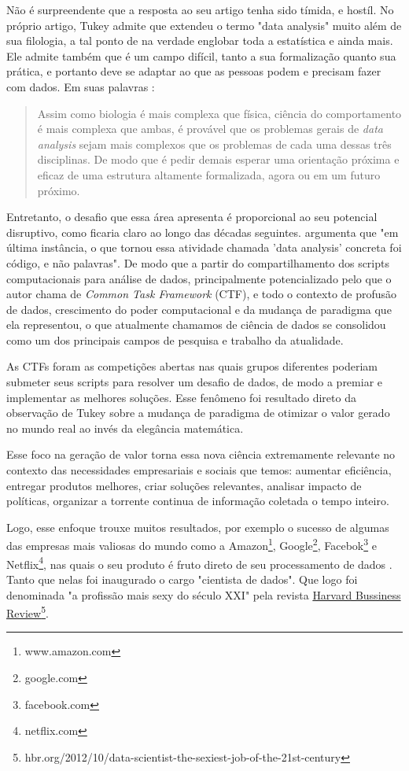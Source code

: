 \documentclass{article}
\begin{document}
Não é surpreendente que a resposta ao seu artigo tenha sido tímida, e hostíl.\cite{DONOHO} No próprio artigo, Tukey admite que extendeu o termo "data analysis" muito além de sua filologia, a tal ponto de na verdade englobar toda a estatística e ainda mais. Ele admite também que é um campo difícil, tanto a sua formalização quanto sua prática, e portanto deve se adaptar ao que as pessoas podem e precisam fazer com dados. Em suas palavras \cite{FoDA}:
\begin{quote}
Assim como biologia é mais complexa que física, ciência do comportamento é mais complexa que ambas, é provável que os problemas gerais de \textit{data analysis} sejam mais complexos que os problemas de cada uma dessas três disciplinas. 
De modo que é pedir demais esperar uma orientação próxima e eficaz de uma estrutura altamente formalizada, agora ou em um futuro próximo. 
\end{quote}

Entretanto, o desafio que essa área apresenta é proporcional ao seu potencial disruptivo, como ficaria claro ao longo das décadas seguintes. \cite{DONOHO} argumenta que "em última instância, o que tornou essa atividade chamada 'data analysis' concreta foi código, e não palavras". De modo que a partir do compartilhamento dos scripts computacionais para análise de dados, principalmente potencializado pelo que o autor chama de \textit{Common Task Framework} (CTF), e todo o contexto de profusão de dados, crescimento do poder computacional e da mudança de paradigma que ela representou, o que atualmente chamamos de ciência de dados se consolidou como um dos principais campos de pesquisa e trabalho da atualidade. \cite{DSmktshare}

As CTFs foram as competições abertas nas quais grupos diferentes poderiam submeter seus scripts para resolver um desafio de dados, de modo a premiar e implementar as melhores soluções. Esse fenômeno foi resultado direto da observação de Tukey sobre a mudança de paradigma de otimizar o valor gerado no mundo real ao invés da elegância matemática. 

Esse foco na geração de valor torna essa nova ciência extremamente relevante no contexto das necessidades empresariais e sociais que temos: aumentar eficiência, entregar produtos melhores, criar soluções relevantes, analisar impacto de políticas, organizar a torrente continua de informação coletada o tempo inteiro. 

Logo, esse enfoque trouxe muitos resultados, por exemplo o sucesso de algumas das empresas mais valiosas do mundo como a Amazon\footnote{www.amazon.com}, Google\footnote{google.com}, Facebok\footnote{facebook.com} e Netflix\footnote{netflix.com}, nas quais o seu produto é fruto direto de seu processamento de dados \cite{DATAHUNGRY}. Tanto que nelas foi inaugurado o cargo "cientista de dados". Que logo foi denominada "a profissão mais sexy do século XXI" pela revista \href{https://hbr.org/2012/10/data-scientist-the-sexiest-job-of-the-21st-century}{Harvard Bussiness Review}\footnote{hbr.org/2012/10/data-scientist-the-sexiest-job-of-the-21st-century}.
\end{document}
